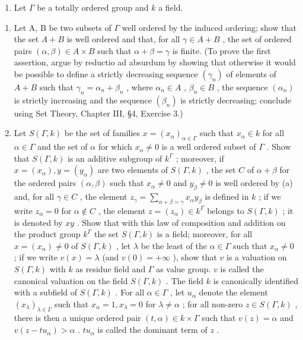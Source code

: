 \begin{enumerate}
\def\labelenumi{\arabic{enumi}.}
\setcounter{enumi}{1}
\tightlist
\item
  Let \(\Gamma\) be a totally ordered group and \(k\) a field.
\end{enumerate}

\begin{enumerate}
\def\labelenumi{(\alph{enumi})}
\item
  Let A, B be two subsets of \(\Gamma\) well ordered by the induced ordering; show that the set \(A + B\) is well ordered and that, for all \(\gamma \in A + B\) , the set of ordered pairs \((\alpha, \beta) \in A \times B\) such that \(\alpha + \beta = \gamma\) is finite. (To prove the first assertion, argue by reductio ad absurdum by showing that otherwise it would be possible to define a strictly decreasing sequence \((\gamma_n)\) of elements of \(A + B\) such that \(\gamma_n = \alpha_n + \beta_n\) , where \(\alpha_n \in A\) , \(\beta_n \in B\) , the sequence \((\alpha_n)\) is strictly increasing and the sequence \((\beta_n)\) is strictly decreasing; conclude using Set Theory, Chapter III, §4, Exercise 3.)
\item
  Let \(S(\Gamma, k)\) be the set of families \(x = (x_{\alpha})_{\alpha \in \Gamma}\) such that \(x_{\alpha} \in k\) for all \(\alpha \in \Gamma\) and the set of \(\alpha\) for which \(x_{\alpha} \neq 0\) is a well ordered subset of \(\Gamma\) . Show that \(S(\Gamma, k)\) is an additive subgroup of \(k^{\Gamma}\) ; moreover, if \(x = (x_{\alpha}), y = (y_{\alpha})\) are two elements of \(S(\Gamma, k)\) , the set \(C\) of \(\alpha + \beta\) for the ordered pairs \((\alpha, \beta)\) such that \(x_{\alpha} \neq 0\) and \(y_{\beta} \neq 0\) is well ordered by (a) and, for all \(\gamma \in C\) , the element \(z_{\gamma} = \sum_{\alpha + \beta = \gamma} x_{\alpha} y_{\beta}\) is defined in \(k\) ; if we write \(z_{\alpha} = 0\) for \(\alpha \notin C\) , the element \(z = (z_{\alpha}) \in k^{\Gamma}\) belongs to \(S(\Gamma, k)\) ; it is denoted by \(xy\) . Show that with this law of composition and addition on the product group \(k^{\Gamma}\) the set \(S(\Gamma, k)\) is a field; moreover, for all \(x = (x_{\alpha}) \neq 0\) of \(S(\Gamma, k)\) , let \(\lambda\) be the least of the \(\alpha \in \Gamma\) such that \(x_{\alpha} \neq 0\) ; if we write \(v(x) = \lambda\) (and \(v(0) = +\infty\) ), show that \(v\) is a valuation on \(S(\Gamma, k)\) with \(k\) as residue field and \(\Gamma\) as value group. \(v\) is called the canonical valuation on the field \(S(\Gamma, k)\) . The field \(k\) is canonically identified with a subfield of \(S(\Gamma, k)\) . For all \(\alpha \in \Gamma\) , let \(u_{\alpha}\) denote the element \((x_{\lambda})_{\lambda \in \Gamma}\) such that \(x_{\alpha} = 1, x_{\lambda} = 0\) for \(\lambda \neq \alpha\) ; for all non-zero \(z \in S(\Gamma, k)\) , there is then a unique ordered pair \((t, \alpha) \in k \times \Gamma\) such that \(v(z) = \alpha\) and \(v(z - tu_{\alpha}) > \alpha\) . \(tu_{\alpha}\) is called the dominant term of \(z\) .
\end{enumerate}

